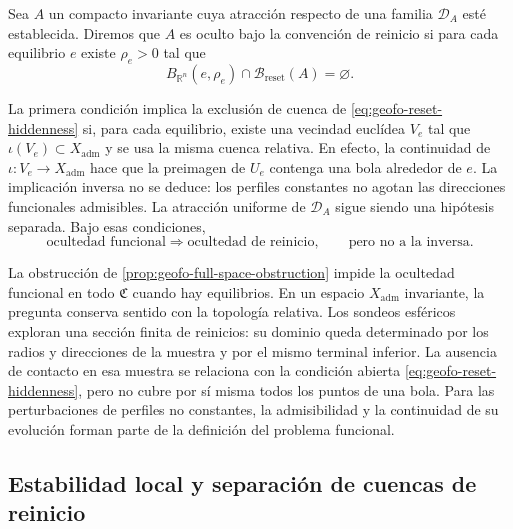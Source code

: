 \begin{definition}
Sea \(A\) un compacto invariante cuya atracción respecto de una familia
\(\mathcal D_A\) esté establecida. Diremos que \(A\) es oculto bajo la
convención de reinicio si para cada
equilibrio \(e\) existe \(\rho_e>0\) tal que
\begin{equation}
 B_{\mathbb R^n}(e,\rho_e)
 \cap\mathcal B_{\mathrm{reset}}(A)=\varnothing.
 \label{eq:geofo-reset-hiddenness}
\end{equation}
\end{definition}

La primera condición implica la exclusión de cuenca de
\cref{eq:geofo-reset-hiddenness} si, para cada equilibrio, existe una
vecindad euclídea \(V_e\) tal que \(\iota(V_e)\subset X_{\mathrm{adm}}\)
y se usa la misma cuenca relativa. En efecto, la continuidad de
\(\iota:V_e\to X_{\mathrm{adm}}\) hace que la preimagen de \(U_e\)
contenga una bola alrededor de \(e\). La implicación inversa no se deduce:
los perfiles constantes no agotan las direcciones funcionales admisibles.
La atracción uniforme de \(\mathcal D_A\) sigue siendo una hipótesis
separada. Bajo esas condiciones,
\begin{equation}
 \text{ocultedad funcional}
 \Longrightarrow
 \text{ocultedad de reinicio},
 \qquad
 \text{pero no a la inversa.}
 \label{eq:geofo-hiddenness-hierarchy}
\end{equation}



La obstrucción de \cref{prop:geofo-full-space-obstruction} impide la
ocultedad funcional en todo \(\mathfrak C\) cuando hay equilibrios.
En un espacio \(X_{\mathrm{adm}}\) invariante, la pregunta conserva
sentido con la topología relativa. Los sondeos esféricos exploran una
sección finita de reinicios: su dominio queda determinado por los radios y
direcciones de la muestra y por el mismo terminal inferior. La ausencia de
contacto en esa muestra se relaciona con la condición abierta
\cref{eq:geofo-reset-hiddenness}, pero no cubre por sí misma todos los puntos
de una bola. Para las perturbaciones de perfiles no constantes, la
admisibilidad y la continuidad de su evolución forman parte de la definición
del problema funcional.

\subsection{Estabilidad local y separación de cuencas de reinicio}

